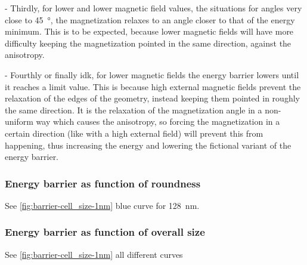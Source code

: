 \documentclass[10pt,a4paper]{article}
\begin{document}
- Thirdly, for lower and lower magnetic field values, the situations for angles very close to \SI{45}{\degree}, the magnetization relaxes to an angle closer to that of the energy minimum. This is to be expected, because lower magnetic fields will have more difficulty keeping the magnetization pointed in the same direction, against the anisotropy.

- Fourthly or finally idk, for lower magnetic fields the energy barrier lowers until it reaches a limit value. This is because high external magnetic fields prevent the relaxation of the edges of the geometry, instead keeping them pointed in roughly the same direction. It is the relaxation of the magnetization angle in a non-uniform way which causes the anisotropy, so forcing the magnetization in a certain direction (like with a high external field) will prevent this from happening, thus increasing the energy and lowering the fictional variant of the energy barrier.

\subsubsection{Energy barrier as function of roundness}
See \cref{fig:barrier-cell_size-1nm} blue curve for \SI{128}{\nano\metre}.

\subsubsection{Energy barrier as function of overall size}
See \cref{fig:barrier-cell_size-1nm} all different curves
\end{document}
